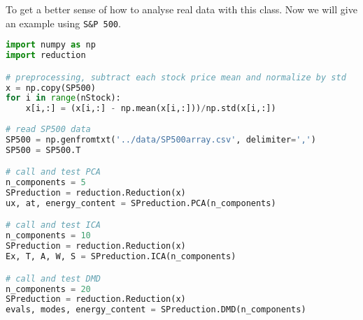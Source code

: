 To get a better sense of how to analyse real data with this class. Now we will give an example using \texttt{S\&P 500}.
\begin{lstlisting}[language=Python]
import numpy as np
import reduction

# preprocessing, subtract each stock price mean and normalize by std
x = np.copy(SP500)
for i in range(nStock):
    x[i,:] = (x[i,:] - np.mean(x[i,:]))/np.std(x[i,:])
    
# read SP500 data
SP500 = np.genfromtxt('../data/SP500array.csv', delimiter=',')
SP500 = SP500.T

# call and test PCA
n_components = 5
SPreduction = reduction.Reduction(x)
ux, at, energy_content = SPreduction.PCA(n_components)

# call and test ICA
n_components = 10
SPreduction = reduction.Reduction(x)
Ex, T, A, W, S = SPreduction.ICA(n_components)

# call and test DMD
n_components = 20
SPreduction = reduction.Reduction(x)
evals, modes, energy_content = SPreduction.DMD(n_components)
\end{lstlisting}
